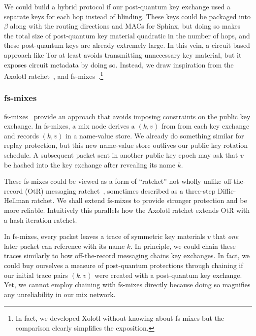\documentclass[twoside,letterpaper]{llncs}
\begin{document}
We could build a hybrid protocol if our post-quantum key exchange
used a separate keys for each hop instead of blinding.  These keys
could be packaged into $\beta$ along with the routing directions and
MACs for Sphinx, but doing so makes the total size of post-quantum 
key material quadratic in the number of hops, and these post-quantum
keys are already extremely large.
In this vein, a circuit based approach like Tor at least avoids
transmitting unnecessary key material, but it exposes circuit
metadata by doing so. 
Instead, we draw inspiration from the Axolotl
ratchet~\cite{TextSecure}, and fs-mixes~\cite{fs-mix}.\footnote{In
  fact, we developed Xolotl without knowing about fs-mixes but the
  comparison clearly simplifies the exposition.}

\subsubsection{fs-mixes}

fs-mixes~\cite{fs-mix} provide an approach that
avoids imposing constraints on the public key exchange.  In fs-mixes,
a mix node derives a $(k,v)$ from from each key exchange and records
$(k,v)$ in a name-value store.  We already do something similar for 
replay protection, but this new name-value store outlives our public
key rotation schedule.  A subsequent packet sent in another public
key epoch may ask that $v$ be hashed into the key exchange after
revealing its name $k$.  

These fs-mixes could be viewed as a form of ``ratchet'' not wholly
unlike off-the-record (OtR) messaging ratchet~\cite{OtR},
sometimes described as a three-step Diffie-Hellman ratchet.  
We shall extend fs-mixes to provide stronger protection and be more
reliable.  Intuitively this parallels how the Axolotl 
ratchet extends OtR with a hash iteration ratchet.

In fs-mixes, every packet leaves a trace of symmetric
key materials $v$ that {\it one} later packet can reference with its
name $k$.  In principle, we could chain these traces similarly to
how off-the-record messaging \cite{OtR} chains key exchanges.
In fact, we could buy ourselves a measure of post-quantum protections
through chaining if our initial trace pairs $(k,v)$ were created with
a post-quantum key exchange.  Yet, we cannot employ chaining with
fs-mixes directly because doing so magnifies any unreliability in
our mix network. 
\end{document}
